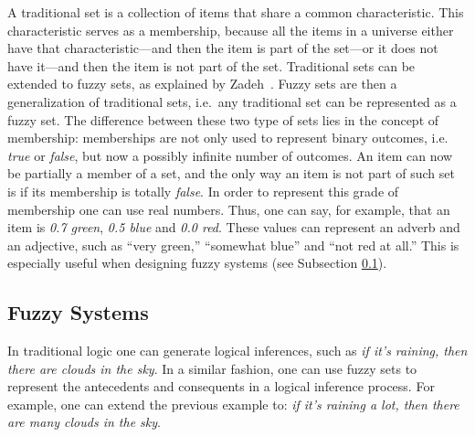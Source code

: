 \documentclass{ieeeaccess}
\begin{document}
A traditional set is a collection of items that share a common
characteristic. This characteristic serves as a membership, because all the
items in a universe either have that characteristic---and then the item is
part of the set---or it does not have it---and then the item is not part of
the set. Traditional sets can be extended to fuzzy sets, as explained by
Zadeh~\cite{Zadeh1965}.
Fuzzy sets are then a generalization of traditional sets,
i.e.\ any traditional set can be represented as a fuzzy set. The difference
between these two type of sets lies in the concept of membership: memberships
are not only used to represent binary outcomes, i.e. \textit{true} or
\textit{false}, but now a possibly infinite number of outcomes. An item can now
be partially a member of a set, and the only way an item is not part of such set
is if its membership is totally \textit{false}. In order to represent this grade
of membership one can use real numbers. Thus, one can say, for example, that an
item is \textit{0.7 green}, \textit{0.5 blue} and \textit{0.0 red}. These values
can represent an adverb and an adjective, such as ``very green,'' ``somewhat
blue'' and ``not red at all.'' This is especially useful when designing fuzzy
systems (see Subsection \ref{subsection:fuzzy-systems}).

\subsection{Fuzzy Systems}
\label{subsection:fuzzy-systems}


In traditional logic one can generate logical inferences, such as \textit{if
it's raining, then there are clouds in the sky}. In a similar fashion, one can
use fuzzy sets to represent the antecedents and consequents in a logical
inference process. For example, one can extend the previous example to:
\textit{if it's raining a lot, then there are many clouds in the sky}.
\end{document}

